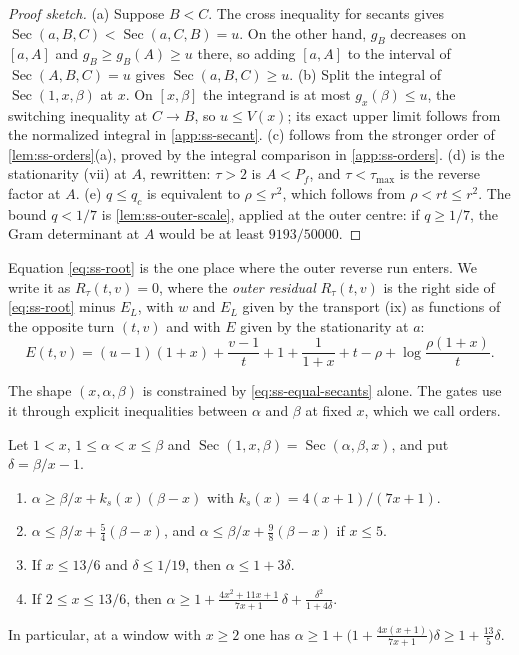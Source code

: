 \begin{proof}[Proof sketch]
(a) Suppose $B<C$. The cross inequality for secants gives
$\operatorname{Sec}(a,B,C)<\operatorname{Sec}(a,C,B)=u$. On the other hand, $g_B$ decreases on $[a,A]$ and
$g_B\ge g_B(A)\ge u$ there, so adding $[a,A]$ to the interval of $\operatorname{Sec}(A,B,C)=u$
gives $\operatorname{Sec}(a,B,C)\ge u$. (b) Split the integral of $\operatorname{Sec}(1,x,\beta)$
at $x$. On $[x,\beta]$ the integrand is at most $g_x(\beta)\le u$, the switching inequality at
$C\to B$, so $u\le V(x)$; its exact upper limit follows from the normalized integral in
\cref{app:ss-secant}. (c) follows from the stronger order of \cref{lem:ss-orders}(a),
proved by the integral comparison in \cref{app:ss-orders}. (d) is the
stationarity (vii) at $A$, rewritten: $\tau>2$ is $A<P_f$, and $\tau<\tau_{\max}$ is the reverse
factor at $A$. (e) $q\le q_c$ is equivalent to $\rho\le r^2$, which follows from $\rho<rt\le r^2$.
The bound $q<1/7$ is \cref{lem:ss-outer-scale}, applied at the outer centre: if
$q\ge1/7$, the Gram determinant at $A$ would be at least $9193/50000$.
\end{proof}

Equation \eqref{eq:ss-root} is the one place where the outer reverse run enters. We write it as
$R_\tau(t,v)=0$, where the \emph{outer residual} $R_\tau(t,v)$ is the
right side of \eqref{eq:ss-root} minus $E_L$, with $w$ and $E_L$ given by the transport (ix) as
functions of the opposite turn $(t,v)$ and with $E$ given by the stationarity at $a$:
\begin{equation}\label{eq:ss-E}
  E(t,v)=(u-1)(1+x)+\frac{v-1}{t}+1+\frac{1}{1+x}+t-\rho+\log\frac{\rho(1+x)}{t}.
\end{equation}

The shape $(x,\alpha,\beta)$ is constrained by \eqref{eq:ss-equal-secants} alone. The gates use
it through explicit inequalities between $\alpha$ and $\beta$ at fixed $x$, which we call orders.

\begin{lemma}\label{lem:ss-orders}
Let $1<x$, $1\le\alpha<x\le\beta$ and $\operatorname{Sec}(1,x,\beta)=\operatorname{Sec}(\alpha,
\beta,x)$, and put $\delta=\beta/x-1$.
\begin{enumerate}[label=(\alph*)]
\item $\alpha\ge\beta/x+k_s(x)(\beta-x)$ with $k_s(x)=4(x+1)/(7x+1)$.
\item $\alpha\le\beta/x+\frac54(\beta-x)$, and $\alpha\le\beta/x+\frac98(\beta-x)$ if $x\le5$.
\item If $x\le13/6$ and $\delta\le1/19$, then $\alpha\le1+3\delta$.
\item If $2\le x\le13/6$, then
  $\alpha\ge1+\frac{4x^2+11x+1}{7x+1}\,\delta+\frac{\delta^2}{1+4\delta}$.
\end{enumerate}
In particular, at a window with $x\ge2$ one has $\alpha\ge1+\bigl(1+\frac{4x(x+1)}{7x+1}\bigr)
\delta\ge1+\frac{13}{5}\delta$.
\end{lemma}

